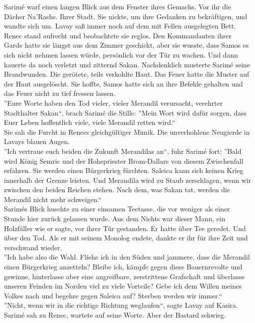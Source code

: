Sarimé warf einen langen Blick aus dem Fenster ihres Gemachs. Vor ihr die Dächer Na'Rashs. Ihrer 
Stadt. Sie nickte, um ihre Gedanken zu bekräftigen, und wandte sich um. Lavay saß immer noch 
auf dem mit Fellen ausgelegten Bett. Renec stand aufrecht und beobachtete sie reglos. 
Den Kommandanten ihrer Garde hatte sie längst aus dem Zimmer geschickt, aber sie wusste, dass Samos 
es sich nicht nehmen lassen würde, persönlich vor der Tür zu wachen. Und dann kauerte da noch 
verletzt und zitternd Sakan. Nachdenklich musterte Sarimé seine Brandwunden. Die gerötete, teils 
verkohlte Haut. Das Feuer hatte die Muster auf der Haut ausgelöscht. Sie hoffte, Samos hatte sich 
an ihre Befehle gehalten und das Feuer nicht zu tief fressen lassen.\\
''Eure Worte haben den Tod vieler, vieler Merandil verursacht, verehrter Stadthalter Sakan``, brach 
Sarimé die Stille: ''Mein Wort wird dafür sorgen, dass Euer Leben hoffentlich viele, viele Merandil 
retten wird.``\\
Sie sah die Furcht in Renecs gleichgültiger Mimik. Die unverhohlene Neugierde in Lavays blauen 
Augen.\\
''Ich vertraue euch beiden die Zukunft Merandilas an``, fuhr Sarimé fort: ''Bald wird König Semric 
und der Hohepriester Brom-Dallars von diesem Zwischenfall erfahren. Sie werden einen Bürgerkrieg 
fürchten. Saleica kann sich keinen Krieg innerhalb der Grenze leisten. Und Merandila wird zu Staub 
zerschlagen, wenn wir zwischen den beiden Reichen stehen. Nach dem, was Sakan tat, werden die 
Merandil nicht mehr schweigen.``\\
Sarimés Blick huschte zu einer einsamen Teetasse, die vor weniger als einer Stunde hier zurück 
gelassen wurde. Aus dem Nichts war dieser Mann, ein Holzfäller wie er sagte, vor ihrer Tür 
gestanden. Er hatte über Tee geredet. Und über den Tod. Als er mit seinem Monolog endete, dankte er 
ihr für ihre Zeit und verschwand wieder.\\
''Ich habe also die Wahl. Fliehe ich in den Süden und jammere, dass die Merandil einen Bürgerkrieg 
anzetteln? Bleibe ich, kämpfe gegen diese Bauernrevolte und gewinne, hinterlasse aber eine 
angreifbare, zerstrittene Grafschaft und überlasse unseren Feinden im Norden viel zu viele 
Vorteile? Gebe ich dem Willen meines Volkes nach und begehre gegen Saleica auf? Sterben werden wir 
immer.``\\
''Nicht, wenn wir in die richtige Richtung weglaufen``, sagte Lavay auf Kasira.\\
Sarimé sah zu Renec, wartete auf seine Worte. Aber der Bastard schwieg.\\
